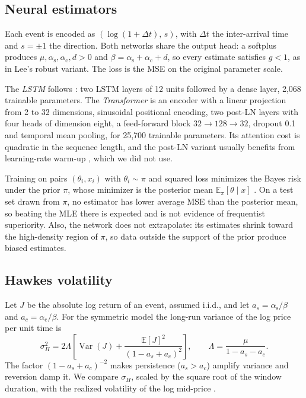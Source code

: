 \documentclass[preprint,12pt,authoryear]{elsarticle}
\newcommand{\aself}{\alpha_{\mathrm{s}}}
\newcommand{\across}{\alpha_{\mathrm{c}}}
\newcommand{\E}{\mathbb{E}}
\begin{document}
\subsection{Neural estimators}

Each event is encoded as $(\log(1+\Delta t),\,s)$, with $\Delta t$ the inter-arrival time and
$s=\pm1$ the direction. Both networks share the output head: a softplus produces
$\mu,\aself,\across,d>0$ and $\beta=\aself+\across+d$, so every estimate satisfies $g<1$, as
in Lee's robust variant. The loss is the MSE on the original parameter scale.

The \emph{LSTM} follows \citet{lee2023}: two LSTM layers of 12 units \citep{hochreiter1997}
followed by a dense layer, 2,068 trainable parameters. The \emph{Transformer} is an encoder
\citep{vaswani2017} with a linear projection from 2 to 32 dimensions, sinusoidal positional
encoding, two post-LN layers with four heads of dimension eight, a feed-forward block
$32\to128\to32$, dropout 0.1 and temporal mean pooling, for 25,700 trainable parameters. Its
attention cost is quadratic in the sequence length, and the post-LN variant usually benefits
from learning-rate warm-up \citep{xiong2020}, which we did not use.

Training on pairs $(\theta_i,x_i)$ with $\theta_i\sim\pi$ and squared loss minimizes the Bayes
risk under the prior $\pi$, whose minimizer is the posterior mean $\E_\pi[\theta\mid x]$
\citep{lehmann1998,sainsburydale2024}. On a test set drawn from
$\pi$, no estimator has lower average MSE than the posterior mean, so beating the MLE there
is expected and is not evidence of frequentist superiority. Also, the network does not
extrapolate: its estimates shrink toward the high-density region of $\pi$, so data outside
the support of the prior produce biased estimates.

\subsection{Hawkes volatility}

Let $J$ be the absolute log return of an event, assumed i.i.d., and let $a_s=\aself/\beta$
and $a_c=\across/\beta$. For the symmetric model the long-run variance of the log price per
unit time is \citep{bacry2013}
\begin{equation}
\sigma_H^2=2\Lambda\left[\operatorname{Var}(J)+\frac{\E[J]^2}{(1-a_s+a_c)^2}\right],
\qquad \Lambda=\frac{\mu}{1-a_s-a_c}.
\label{eq:hawkes-vol}
\end{equation}
The factor $(1-a_s+a_c)^{-2}$ makes persistence ($a_s>a_c$) amplify variance and reversion
damp it. We compare $\sigma_H$, scaled by the square root of the window duration, with the
realized volatility of the log mid-price \citep{andersen2003,barndorff2002}.
\end{document}
